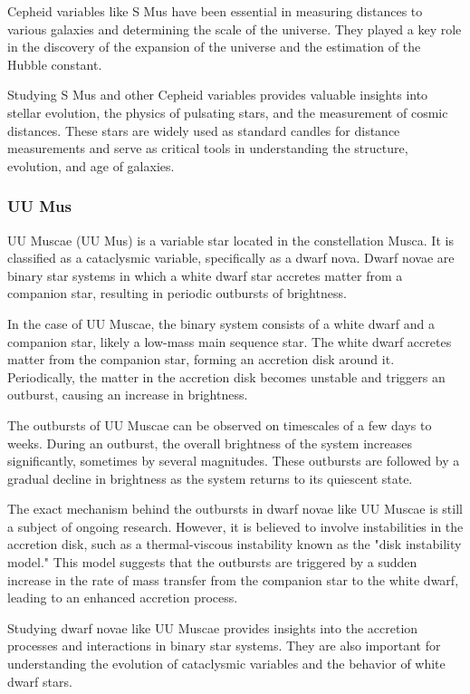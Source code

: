 Cepheid variables like S Mus have been essential in measuring distances to various galaxies and determining the scale of the universe. They played a key role in the discovery of the expansion of the universe and the estimation of the Hubble constant.

Studying S Mus and other Cepheid variables provides valuable insights into stellar evolution, the physics of pulsating stars, and the measurement of cosmic distances. These stars are widely used as standard candles for distance measurements and serve as critical tools in understanding the structure, evolution, and age of galaxies.








\subsubsection*{ UU Mus }
UU Muscae (UU Mus) is a variable star located in the constellation Musca. It is classified as a cataclysmic variable, specifically as a dwarf nova. Dwarf novae are binary star systems in which a white dwarf star accretes matter from a companion star, resulting in periodic outbursts of brightness.

In the case of UU Muscae, the binary system consists of a white dwarf and a companion star, likely a low-mass main sequence star. The white dwarf accretes matter from the companion star, forming an accretion disk around it. Periodically, the matter in the accretion disk becomes unstable and triggers an outburst, causing an increase in brightness.

The outbursts of UU Muscae can be observed on timescales of a few days to weeks. During an outburst, the overall brightness of the system increases significantly, sometimes by several magnitudes. These outbursts are followed by a gradual decline in brightness as the system returns to its quiescent state.

The exact mechanism behind the outbursts in dwarf novae like UU Muscae is still a subject of ongoing research. However, it is believed to involve instabilities in the accretion disk, such as a thermal-viscous instability known as the "disk instability model." This model suggests that the outbursts are triggered by a sudden increase in the rate of mass transfer from the companion star to the white dwarf, leading to an enhanced accretion process.

Studying dwarf novae like UU Muscae provides insights into the accretion processes and interactions in binary star systems. They are also important for understanding the evolution of cataclysmic variables and the behavior of white dwarf stars.

